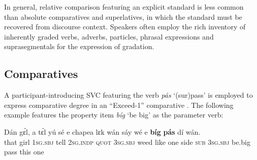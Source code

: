 \begin{table}
\caption{Comparison}
\small
\label{tab:key:6.9}
\end{table}
In general, relative comparison featuring an explicit standard is less common than absolute comparatives and superlatives, in which the standard must be recovered from discourse context. Speakers often employ the rich inventory of inherently graded verbs, adverbs, particles, phrasal expressions and suprasegmentals for the expression of gradation. 

\subsection{Comparatives}\label{sec:6.9.1}

A participant-introducing\index{} SVC featuring the verb \textit{pás} ‘(sur)pass’ is employed to express comparative degree in an “Exceed-1” comparative \citep{Stassen1985}. The following example features the property item \textit{bíg} ‘be big’ as the parameter verb: 


\ea%
    \label{ex:key:467}
    \gll Dán    gɛ́l,  a    tɛ́l  yú    sé    e    chapea
lɛk  wán    sáy    wé  e    \textbf{bíg}    \textbf{pás}    dí  wán.\\
that    girl  \textsc{1sg.sbj}  tell  \textsc{2sg.indp}  \textsc{quot}    \textsc{3sg.sbj}  weed
like  one    side    \textsc{sub}  \textsc{3sg.sbj}  be.big  pass    this  one\\

